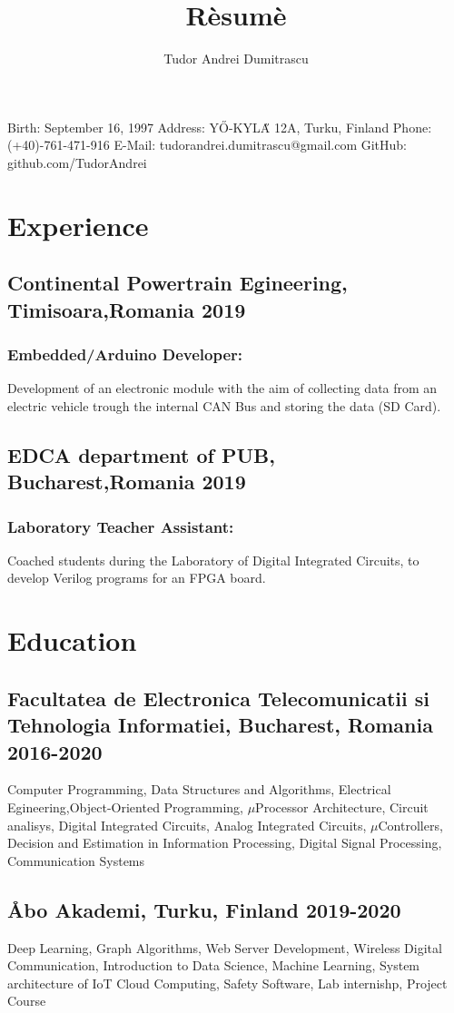 \documentclass{article}
\makeatletter
\renewcommand{\maketitle}{
\begin{center}
{\huge\bfseries
\theauthor}

\end{center}
\vspace{.25em}
\begin{flushleft}{
Birth: September 16, 1997 \newline
Address: Y{\H O}-KYL{\H A} 12A, Turku, Finland \newline
Phone: (+40)-761-471-916 \newline
E-Mail: tudorandrei.dumitrascu@gmail.com \newline
GitHub: github.com/TudorAndrei \newline}
\end{flushleft}
}
\makeatother
\begin{document}
\title{R\`esum\`e}
\author{Tudor Andrei Dumitrascu}

\maketitle


\section{Experience}
\subsection{Continental Powertrain Egineering, Timisoara,Romania 2019}
\subsubsection{Embedded/Arduino Developer:}
Development of an electronic module with the aim of collecting data from an electric vehicle trough the internal CAN Bus and storing the data (SD Card).
\subsection{EDCA department of PUB, Bucharest,Romania 2019}
\subsubsection{Laboratory Teacher Assistant:}
Coached students during the Laboratory of Digital Integrated Circuits, to develop Verilog programs for an FPGA board.

\section{Education}
\subsection{Facultatea de Electronica Telecomunicatii si Tehnologia Informatiei, Bucharest, Romania 2016-2020}
Computer Programming, Data Structures and Algorithms, Electrical Egineering,Object-Oriented Programming, $\mu$Processor Architecture, Circuit analisys, Digital Integrated Circuits, 
Analog Integrated Circuits, $\mu$Controllers, Decision and Estimation in Information Processing, Digital Signal Processing, Communication Systems

\subsection{{\AA}bo Akademi, Turku, Finland 2019-2020}
Deep Learning, Graph Algorithms, Web Server Development, Wireless Digital Communication, Introduction to Data Science, Machine Learning, System architecture of IoT Cloud Computing, Safety Software,
Lab internishp, Project Course
\end{document}
